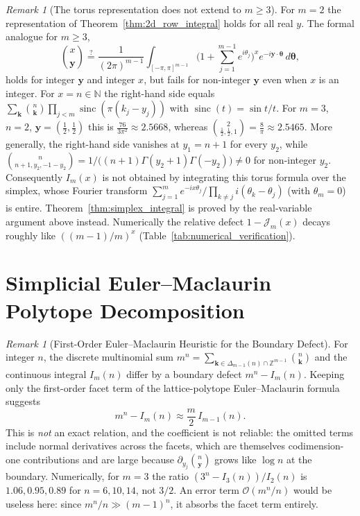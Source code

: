\documentclass[11pt,a4paper]{article}
\theoremstyle{plain}
\theoremstyle{definition}
\theoremstyle{remark}
\newtheorem{remark}[theorem]{Remark}
\numberwithin{equation}{section}
\begin{document}
\begin{remark}[The torus representation does not extend to $m \ge 3$]
For $m = 2$ the representation of Theorem~\ref{thm:2d_row_integral} holds for all real $y$. The formal analogue for $m \ge 3$,
\[
\binom{x}{\mathbf{y}} \overset{?}{=} \frac{1}{(2\pi)^{m-1}}\int_{[-\pi, \pi]^{m-1}} \Big(1 + \sum_{j=1}^{m-1}e^{i\theta_j}\Big)^x e^{-i\mathbf{y}\cdot\boldsymbol{\theta}}\,d\boldsymbol{\theta},
\]
holds for integer $\mathbf{y}$ and integer $x$, but fails for non-integer $\mathbf{y}$ even when $x$ is an integer. For $x = n \in \mathbb{N}$ the right-hand side equals $\sum_{\mathbf{k}}\binom{n}{\mathbf{k}}\prod_{j<m}\operatorname{sinc}(\pi(k_j - y_j))$ with $\operatorname{sinc}(t) = \sin t/t$. For $m = 3$, $n = 2$, $\mathbf{y} = (\frac12, \frac12)$ this is $\frac{76}{3\pi^2} \approx 2.5668$, whereas $\binom{2}{\frac12, \frac12, 1} = \frac{8}{\pi} \approx 2.5465$. More generally, the right-hand side vanishes at $y_1 = n+1$ for every $y_2$, while $\binom{n}{n+1, y_2, -1-y_2} = 1/\big((n+1)\Gamma(y_2+1)\Gamma(-y_2)\big) \neq 0$ for non-integer $y_2$. Consequently $I_m(x)$ is not obtained by integrating this torus formula over the simplex, whose Fourier transform $\sum_{j=1}^m e^{-ix\theta_j}/\prod_{k \ne j} i(\theta_k - \theta_j)$ (with $\theta_m = 0$) is entire. Theorem~\ref{thm:simplex_integral} is proved by the real-variable argument above instead. Numerically the relative defect $1 - \mathcal{J}_m(x)$ decays roughly like $((m-1)/m)^x$ (Table~\ref{tab:numerical_verification}).
\end{remark}

\section{Simplicial Euler--Maclaurin Polytope Decomposition}

\begin{remark}[First-Order Euler--Maclaurin Heuristic for the Boundary Defect]
For integer $n$, the discrete multinomial sum $m^n = \sum_{\mathbf{k} \in \Delta_{m-1}(n) \cap \mathbb{Z}^{m-1}} \binom{n}{\mathbf{k}}$ and the continuous integral $I_m(n)$ differ by a boundary defect $m^n - I_m(n)$. Keeping only the first-order facet term of the lattice-polytope Euler--Maclaurin formula suggests
\begin{equation}
m^n - I_m(n) \approx \frac{m}{2}\,I_{m-1}(n).
\end{equation}
This is \emph{not} an exact relation, and the coefficient is not reliable: the omitted terms include normal derivatives across the facets, which are themselves codimension-one contributions and are large because $\partial_{y_j}\binom{n}{\mathbf{y}}$ grows like $\log n$ at the boundary. Numerically, for $m = 3$ the ratio $(3^n - I_3(n))/I_2(n)$ is $1.06, 0.95, 0.89$ for $n = 6, 10, 14$, not $3/2$. An error term $\mathcal{O}(m^n/n)$ would be useless here: since $m^n/n \gg (m-1)^n$, it absorbs the facet term entirely.
\end{remark}
\end{document}
